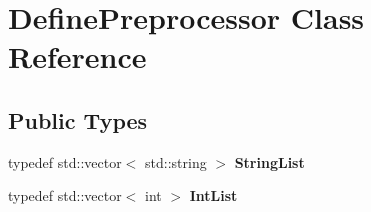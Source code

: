 \hypertarget{class_define_preprocessor}{}\section{Define\+Preprocessor Class Reference}
\label{class_define_preprocessor}
\subsection*{Public Types}
\begin{DoxyCompactItemize}
\item 
\mbox{\label{class_define_preprocessor_ad755374607c28fa94a34170e4957c96d}} 
typedef std\+::vector$<$ std\+::string $>$ {\bfseries String\+List}
\item 
\mbox{\label{class_define_preprocessor_a32693278b748b3d593bbd7d48838ffc6}} 
typedef std\+::vector$<$ int $>$ {\bfseries Int\+List}
\end{DoxyCompactItemize}
